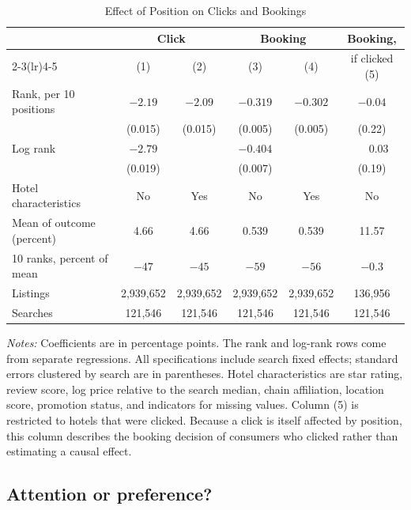 \documentclass[12pt]{article}
\begin{document}
\begin{table}[htbp]
\centering
\begin{threeparttable}
\caption{Effect of Position on Clicks and Bookings}
\label{tab:position}
\small\setlength{\tabcolsep}{4pt}
\begin{tabular}{lccccc}
\toprule
 & \multicolumn{2}{c}{Click} & \multicolumn{2}{c}{Booking} & Booking, \\
\cmidrule(lr){2-3}\cmidrule(lr){4-5}
 & (1) & (2) & (3) & (4) & if clicked (5) \\
\midrule
Rank, per 10 positions & $-2.19$ & $-2.09$ & $-0.319$ & $-0.302$ & $-0.04$ \\
 & (0.015) & (0.015) & (0.005) & (0.005) & (0.22) \\[0.3em]
Log rank & $-2.79$ & & $-0.404$ & & $\phantom{-}0.03$ \\
 & (0.019) & & (0.007) & & (0.19) \\[0.3em]
Hotel characteristics & No & Yes & No & Yes & No \\
Mean of outcome (percent) & 4.66 & 4.66 & 0.539 & 0.539 & 11.57 \\
10 ranks, percent of mean & $-47$ & $-45$ & $-59$ & $-56$ & $-0.3$ \\
Listings & 2,939,652 & 2,939,652 & 2,939,652 & 2,939,652 & 136,956 \\
Searches & 121,546 & 121,546 & 121,546 & 121,546 & 121,546 \\
\bottomrule
\end{tabular}
\begin{tablenotes}\footnotesize
\item \textit{Notes:} Coefficients are in percentage points. The rank and log-rank rows come from separate regressions. All specifications include search fixed effects; standard errors clustered by search are in parentheses. Hotel characteristics are star rating, review score, log price relative to the search median, chain affiliation, location score, promotion status, and indicators for missing values. Column (5) is restricted to hotels that were clicked. Because a click is itself affected by position, this column describes the booking decision of consumers who clicked rather than estimating a causal effect.
\end{tablenotes}
\end{threeparttable}
\end{table}

\subsection{Attention or preference?}
\end{document}
